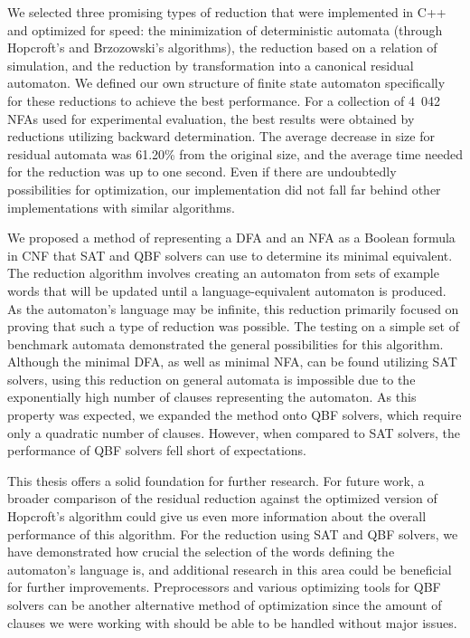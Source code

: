 We selected three promising types of reduction that were implemented in C++ and optimized for speed: the minimization of deterministic automata (through Hopcroft's and Brzozowski's algorithms), the reduction based on a relation of simulation, and the reduction by transformation into a canonical residual automaton. We defined our own structure of finite state automaton specifically for these reductions to achieve the best performance. For a collection of 4\ 042 NFAs used for experimental evaluation, the best results were obtained by reductions utilizing backward determination. The average decrease in size for residual automata was 61.20\% from the original size, and the average time needed for the reduction was up to one second. Even if there are undoubtedly possibilities for optimization, our implementation did not fall far behind other implementations with similar algorithms.

We proposed a method of representing a DFA and an NFA as a Boolean formula in CNF that SAT and QBF solvers can use to determine its minimal equivalent. The reduction algorithm involves creating an automaton from sets of example words that will be updated until a language-equivalent automaton is produced. As the automaton's language may be infinite, this reduction primarily focused on proving that such a type of reduction was possible. The testing on a simple set of benchmark automata demonstrated the general possibilities for this algorithm. Although the minimal DFA, as well as minimal NFA, can be found utilizing SAT solvers, using this reduction on general automata is impossible due to the exponentially high number of clauses representing the automaton. As this property was expected, we expanded the method onto QBF solvers, which require only a quadratic number of clauses. However, when compared to SAT solvers, the performance of QBF solvers fell short of expectations.

This thesis offers a solid foundation for further research. For future work, a broader comparison of the residual reduction against the optimized version of Hopcroft's algorithm could give us even more information about the overall performance of this algorithm. For the reduction using SAT and QBF solvers, we have demonstrated how crucial the selection of the words defining the automaton's language is, and additional research in this area could be beneficial for further improvements. Preprocessors and various optimizing tools for QBF solvers can be another alternative method of optimization since the amount of clauses we were working with should be able to be handled without major issues.


% 
